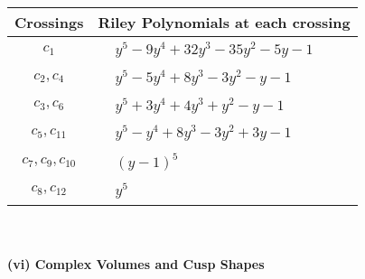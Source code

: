\documentclass[1p]{elsarticle_modified}
\theoremstyle{definition}
\begin{document}
\begin{tabular}{m{50pt}|m{274pt}}
Crossings & \hspace{64pt}Riley Polynomials at each crossing \\
\hline $$\begin{aligned}c_{1}\end{aligned}$$&$\begin{aligned}
&y^5-9 y^4+32 y^3-35 y^2-5 y-1
\end{aligned}$\\
\hline $$\begin{aligned}c_{2},c_{4}\end{aligned}$$&$\begin{aligned}
&y^5-5 y^4+8 y^3-3 y^2- y-1
\end{aligned}$\\
\hline $$\begin{aligned}c_{3},c_{6}\end{aligned}$$&$\begin{aligned}
&y^5+3 y^4+4 y^3+y^2- y-1
\end{aligned}$\\
\hline $$\begin{aligned}c_{5},c_{11}\end{aligned}$$&$\begin{aligned}
&y^5- y^4+8 y^3-3 y^2+3 y-1
\end{aligned}$\\
\hline $$\begin{aligned}c_{7},c_{9},c_{10}\end{aligned}$$&$\begin{aligned}
&(y-1)^5
\end{aligned}$\\
\hline $$\begin{aligned}c_{8},c_{12}\end{aligned}$$&$\begin{aligned}
&y^5
\end{aligned}$\\
\hline
\end{tabular}\\~\\
\newpage\flushleft \textbf{(vi) Complex Volumes and Cusp Shapes}
\end{document}
